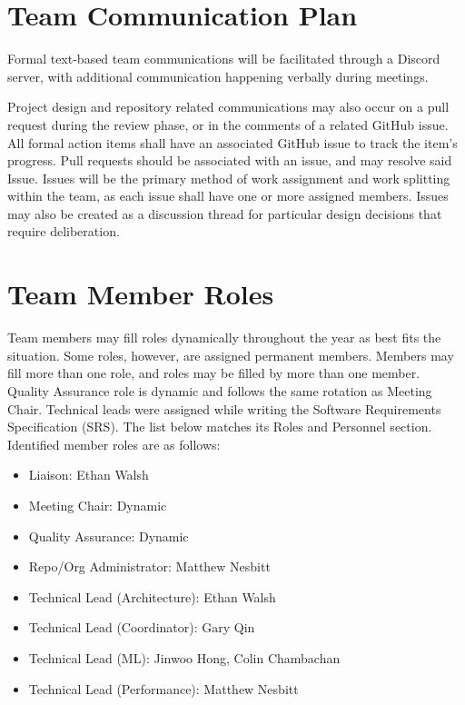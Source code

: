 \documentclass{article}
\begin{document}
\section{Team Communication Plan}

Formal text-based team communications will be facilitated through a Discord server, with additional
communication happening verbally during meetings.

\vspace{5mm}

Project design and repository related communications may also occur on a pull request during the
review phase, or in the comments of a related GitHub issue. All formal action items shall have an
associated GitHub issue to track the item's progress. Pull requests should be associated with an
issue, and may resolve said Issue. Issues will be the primary method of work assignment and work
splitting within the team, as each issue shall have one or more assigned members. Issues may also be
created as a discussion thread for particular design decisions that require deliberation.

\section{Team Member Roles}

Team members may fill roles dynamically throughout the year as best fits the situation. Some roles,
however, are assigned permanent members. Members may fill more than one role, and roles may be
filled by more than one member. Quality Assurance role is dynamic and follows the same rotation as Meeting Chair.
Technical leads were assigned while writing the Software Requirements
Specification (SRS). The list below matches its Roles and Personnel section.
Identified member roles are as follows:
\begin{itemize}
	\item Liaison: Ethan Walsh
	\item Meeting Chair: Dynamic
	\item Quality Assurance: Dynamic
	\item Repo/Org Administrator: Matthew Nesbitt
	\item Technical Lead (Architecture): Ethan Walsh
	\item Technical Lead (Coordinator): Gary Qin
	\item Technical Lead (ML): Jinwoo Hong, Colin Chambachan
	\item Technical Lead (Performance): Matthew Nesbitt
\end{itemize}
\end{document}
